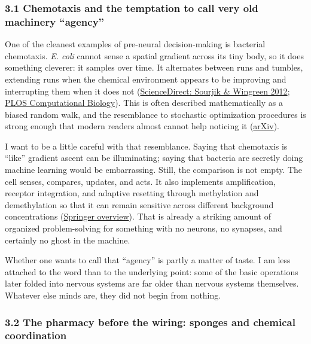 \subsubsection{3.1 Chemotaxis and the temptation to call very old machinery ``agency''}\label{03_it_started-chemotaxis-and-the-temptation-to-call-very-old-machinery-agency}

One of the cleanest examples of pre-neural decision-making is bacterial chemotaxis. \emph{E. coli} cannot sense a spatial gradient across its tiny body, so it does something cleverer: it samples over time. It alternates between runs and tumbles, extending runs when the chemical environment appears to be improving and interrupting them when it does not (\href{https://www.sciencedirect.com/science/article/abs/pii/S0955067411001542}{ScienceDirect: Sourjik \& Wingreen 2012}; \href{https://journals.plos.org/ploscompbiol/article?id=10.1371/journal.pcbi.1005966}{PLOS Computational Biology}). This is often described mathematically as a biased random walk, and the resemblance to stochastic optimization procedures is strong enough that modern readers almost cannot help noticing it (\href{https://arxiv.org/abs/2511.18745}{arXiv}).

I want to be a little careful with that resemblance. Saying that chemotaxis is ``like'' gradient ascent can be illuminating; saying that bacteria are secretly doing machine learning would be embarrassing. Still, the comparison is not empty. The cell senses, compares, updates, and acts. It also implements amplification, receptor integration, and adaptive resetting through methylation and demethylation so that it can remain sensitive across different background concentrations (\href{https://link.springer.com/article/10.1007/s11538-008-9321-6}{Springer overview}). That is already a striking amount of organized problem-solving for something with no neurons, no synapses, and certainly no ghost in the machine.

Whether one wants to call that ``agency'' is partly a matter of taste. I am less attached to the word than to the underlying point: some of the basic operations later folded into nervous systems are far older than nervous systems themselves. Whatever else minds are, they did not begin from nothing.

\subsubsection{3.2 The pharmacy before the wiring: sponges and chemical coordination}\label{03_it_started-the-pharmacy-before-the-wiring-sponges-and-chemical-coordination}

